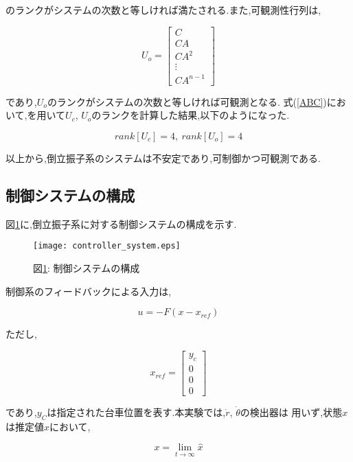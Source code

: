 のランクがシステムの次数と等しければ満たされる.また,可観測性行列は,

$$
    U_{o} = 
    \left[
        \begin{array}{c}
            C \\
            CA \\
            CA^2 \\
            \vdots \\
            CA^{n-1}
        \end{array}
    \right]
$$

であり,$U_{o}$のランクがシステムの次数と等しければ可観測となる.
式(\ref{ABC})において,\MaTX{}を用いて$U_{c}$, $U_{o}$のランクを計算した結果,以下のようになった.

$$
    rank[U_c] = 4,\ rank[U_o] = 4
$$

以上から,倒立振子系のシステムは不安定であり,可制御かつ可観測である.

\subsection{制御システムの構成}
図\ref{controller_system}に,倒立振子系に対する制御システムの構成を示す.

\begin{figure}[htbp]
    \begin{center}
        \texttt{[image: controller\_system.eps]}
        \caption{図\ref{controller_system}: 制御システムの構成}
        \label{controller_system}
    \end{center}
\end{figure}

制御系のフィードバックによる入力は,

$$
    u = -F \left( x - x_{ref} \right)
$$

ただし,

$$
    x_{ref} =
    \left[
        \begin{array}{c}
            y_{c} \\
            0 \\
            0 \\
            0
        \end{array}
    \right]
$$

であり,$y_{C}$は指定された台車位置を表す.本実験では,$\dot{r}$, $\dot{\theta}$の検出器は
用いず,状態$x$は推定値$\hat{x}$において,

\begin{equation}
    x = \lim_{t \to \infty} \hat{x}
    \label{definition_x}
\end{equation}

